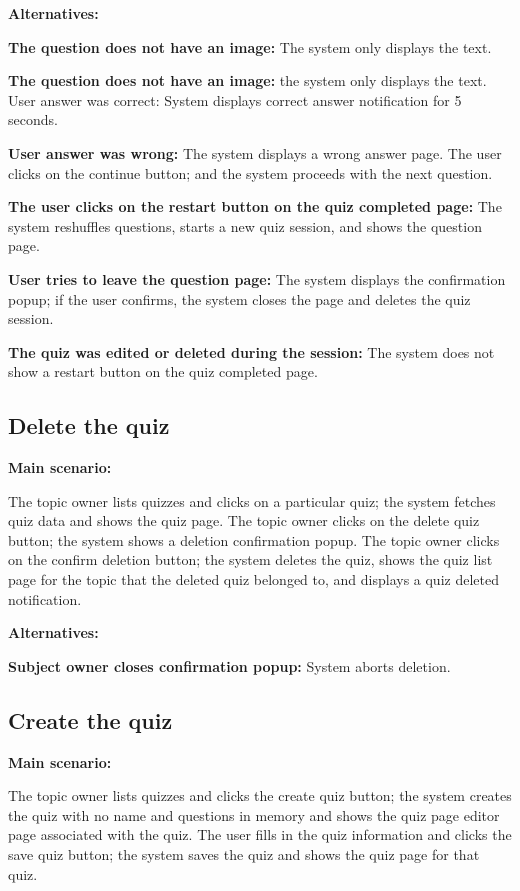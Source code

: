 \documentclass[
    english, %
]{VUMIFPSkursinis}
\begin{document}
\noindent\textbf{\fontsize{13}{15}\selectfont Alternatives:}

\textbf{The question does not have an image:} The system only displays the text.

\textbf{The question does not have an image:} the system only displays the text.
User answer was correct: System displays correct answer notification for 5 seconds.

\textbf{User answer was wrong:} The system displays a wrong answer page. The user clicks on the continue button; and the system proceeds with the next question.

\textbf{The user clicks on the restart button on the quiz completed page:} The system reshuffles questions, starts a new quiz session, and shows the question page.

\textbf{User tries to leave the question page:} The system displays the confirmation popup; if the user confirms, the system closes the page and deletes the quiz session.

\textbf{The quiz was edited or deleted during the session:} The system does not show a restart button on the quiz completed page.

\subsection{Delete the quiz}

\noindent\textbf{\fontsize{13}{15}\selectfont Main scenario:}

The topic owner lists quizzes and clicks on a particular quiz; the system fetches quiz data and shows the quiz page. The topic owner clicks on the delete quiz button; the system shows a deletion confirmation popup. The topic owner clicks on the confirm deletion button; the system deletes the quiz, shows the quiz list page for the topic that the deleted quiz belonged to, and displays a quiz deleted notification.

\noindent\textbf{\fontsize{13}{15}\selectfont Alternatives:}

\textbf{Subject owner closes confirmation popup:} System aborts deletion.

\subsection{Create the quiz}

\noindent\textbf{\fontsize{13}{15}\selectfont Main scenario:}

The topic owner lists quizzes and clicks the create quiz button; the system creates the quiz with no name and questions in memory and shows the quiz page editor page associated with the quiz. The user fills in the quiz information and clicks the save quiz button; the system saves the quiz and shows the quiz page for that quiz.
\end{document}
